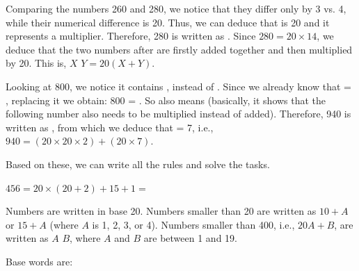 \begin{refsection}
\begin{mysolution}
{\begin{tabular}{cl}
    \end{tabular}
}

 Comparing the numbers 260 and 280, we notice that they differ only by 3 vs. 4, while their numerical difference is 20. Thus, we can deduce that  is 20 and it represents a multiplier. Therefore, 280 is written as \texttr{20\times}  . Since $280 = 20\times14$, we deduce that the two numbers after \texttr{20\times} are firstly added together and then multiplied by 20. This is,  $X$ $Y = 20(X+Y)$.

Looking at 800, we notice it contains , instead of . Since we already know that  = \texttr{20\times}, replacing it we obtain: 800 = \texttr{20\times}  . So  also means \texttr{20\times} (basically, it shows that the following number also needs to be multiplied instead of added).
Therefore, 940 is written as  , from which we deduce that  = 7, i.e., $940 = (20\times20\times2)+(20\times7)$.

Based on these, we can write all the rules and solve the tasks.

\begin{solutions}
\item {}
     
\item $456 = 20\times (20+2)+15+1 =$ 
\end{solutions}

 Numbers are written in base 20. Numbers smaller than 20 are written as $10 + A$ or $15 + A$ (where $A$ is 1, 2, 3, or 4). Numbers smaller than 400, i.e., $20A + B$, are written as  $A$ $B$, where $A$ and $B$ are between 1 and 19.

\pagebreak
Base words are:
\begin{enumerate}[leftmargin = 5em, label = \arabic*]


\end{enumerate}
\end{mysolution}
\end{refsection}
